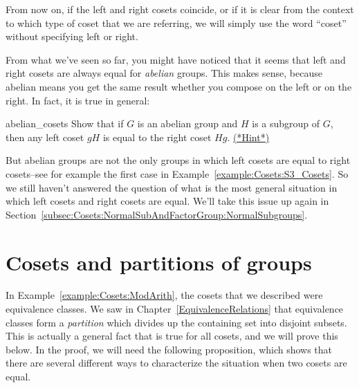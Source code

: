 \begin{rem}
From now on, if the left and right cosets coincide, or if it is clear from the context to which type of coset that we are referring, we will simply use the word ``coset'' without specifying left or right.
\end{rem}

From what we've seen so far, you might have noticed that it seems that left and right cosets are always equal for \emph{abelian} groups.  This makes sense, because
 abelian means you get the same result whether you compose on the left or on the right. In fact, it is true in general: 

  

\begin{exercise}{abelian_cosets}
Show that if $G$ is an abelian group and $H$ is a subgroup of $G$, then any left coset $gH$ is equal to the right coset $Hg$.  
\hyperref[sec:Cosets:Hints]{(*Hint*)}
\end{exercise}

But abelian groups are not the only groups in which left cosets are equal to right cosets--see for example the first case in Example~\ref{example:Cosets:S3_Cosets}. So we still haven't answered the question of what is the most general situation in which left cosets and right cosets are equal. We'll take this issue up again in Section~\ref{subsec:Cosets:NormalSubAndFactorGroup:NormalSubgroups}.

\section{Cosets and partitions of groups}
\label{sec:Cosets:CosetsPartitions}

In Example~\ref{example:Cosets:ModArith}, the cosets that we described were equivalence classes. We saw in Chapter~\ref{EquivalenceRelations} that equivalence classes form a \emph{partition} which divides up the containing set into disjoint subsets.
This is actually a general fact that is true for all cosets, and we will prove this below. In the proof, we will need the following proposition, which shows that there are several different ways to characterize the situation when  two cosets are equal.  

